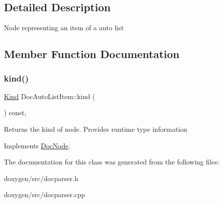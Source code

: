\subsection{Detailed Description}
Node representing an item of a auto list 

\subsection{Member Function Documentation}
\mbox{\label{class_doc_auto_list_item_a4a405f6baad7d2ddb30df82ab73d7ab5}} 
\subsubsection{\texorpdfstring{kind()}{kind()}}
{\footnotesize\ttfamily \mbox{\hyperlink{class_doc_node_aebd16e89ca590d84cbd40543ea5faadb}{Kind}} Doc\+Auto\+List\+Item\+::kind (\begin{DoxyParamCaption}{ }\end{DoxyParamCaption}) const\hspace{0.3cm}{\ttfamily [inline]}, {\ttfamily [virtual]}}

Returns the kind of node. Provides runtime type information 

Implements \mbox{\hyperlink{class_doc_node_a108ffd214a72ba6e93dac084a8f58049}{Doc\+Node}}.



The documentation for this class was generated from the following files\+:\begin{DoxyCompactItemize}
\item 
doxygen/src/docparser.\+h\item 
doxygen/src/docparser.\+cpp\end{DoxyCompactItemize}
